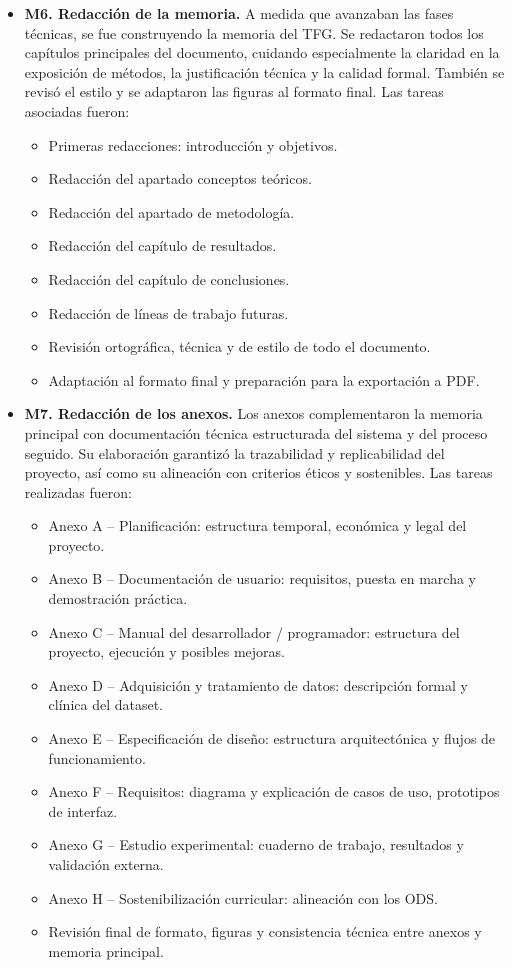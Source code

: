 \begin{itemize}
  \item \textbf{M6. Redacción de la memoria.}
  A medida que avanzaban las fases técnicas, se fue construyendo la memoria del TFG. Se redactaron todos los capítulos principales del documento, cuidando especialmente la claridad en la exposición de métodos, la justificación técnica y la calidad formal. También se revisó el estilo y se adaptaron las figuras al formato final.  
  Las tareas asociadas fueron:
  
  \begin{itemize}
    \item Primeras redacciones: introducción y objetivos.
    \item Redacción del apartado conceptos teóricos.
    \item Redacción del apartado de metodología.
    \item Redacción del capítulo de resultados.
    \item Redacción del capítulo de conclusiones.
    \item Redacción de líneas de trabajo futuras.
    \item Revisión ortográfica, técnica y de estilo de todo el documento.
    \item Adaptación al formato final y preparación para la exportación a PDF.
    
  \end{itemize}

  \item \textbf{M7. Redacción de los anexos.}
  Los anexos complementaron la memoria principal con documentación técnica estructurada del sistema y del proceso seguido. Su elaboración garantizó la trazabilidad y replicabilidad del proyecto, así como su alineación con criterios éticos y sostenibles.  
  Las tareas realizadas fueron:
  
  \begin{itemize}
    \item Anexo A – Planificación: estructura temporal, económica y legal del proyecto.
    \item Anexo B – Documentación de usuario: requisitos, puesta en marcha y demostración práctica.
    \item Anexo C – Manual del desarrollador / programador: estructura del proyecto, ejecución y posibles mejoras.
    \item Anexo D – Adquisición y tratamiento de datos: descripción formal y clínica del dataset.
    \item Anexo E – Especificación de diseño: estructura arquitectónica y flujos de funcionamiento.
    \item Anexo F – Requisitos: diagrama y explicación de casos de uso, prototipos de interfaz.
    \item Anexo G – Estudio experimental: cuaderno de trabajo, resultados y validación externa.
    \item Anexo H – Sostenibilización curricular: alineación con los ODS.
    \item Revisión final de formato, figuras y consistencia técnica entre anexos y memoria principal.
  \end{itemize}
\end{itemize}


